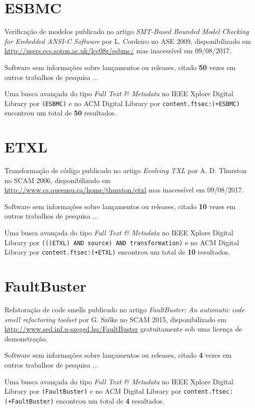 \section{ESBMC}

Verificação de modelos
publicado no artigo {\it SMT-Based Bounded Model Checking for Embedded ANSI-C Software}
por L. Cordeiro
no ASE 2009,
disponibilizado em \url{http://users.ecs.soton.ac.uk/lcc08r/esbmc/}
mas inacessível em 09/08/2017.

Software sem informações sobre lançamentos ou releases,
citado {\bf 50} vezes em outros trabalhos de pesquisa ...

Uma busca avançada do tipo {\it Full Text \& Metadata} no IEEE Xplore Digital Library por
\texttt{(ESBMC)}
e no ACM Digital Library por
\texttt{content.ftsec:(+ESBMC)}
encontrou um total de
{\bf 50}
resultados.

\section{ETXL}

Transformação de código
publicado no artigo {\it Evolving TXL}
por A. D. Thurston
no SCAM 2006,
disponibilizado em \url{http://www.cs.queensu.ca/home/thurston/etxl}
mas inacessível em 09/08/2017.

Software sem informações sobre lançamentos ou releases,
citado {\bf 10} vezes em outros trabalhos de pesquisa ...

Uma busca avançada do tipo {\it Full Text \& Metadata} no IEEE Xplore Digital Library por
\texttt{(((ETXL) AND source) AND transformation)}
e no ACM Digital Library por
\texttt{content.ftsec:(+ETXL)}
encontrou um total de
{\bf 10}
resultados.

\section{FaultBuster}

Refatoração de code smells
publicado no artigo {\it FaultBuster: An automatic code smell refactoring toolset}
por G. Szőke
no SCAM 2015,
disponibilizado em \url{http://www.sed.inf.u-szeged.hu/FaultBuster}
gratuitamente
sob uma licença de demonstração.

Software sem informações sobre lançamentos ou releases,
citado {\bf 4} vezes em outros trabalhos de pesquisa ...

Uma busca avançada do tipo {\it Full Text \& Metadata} no IEEE Xplore Digital Library por
\texttt{(FaultBuster)}
e no ACM Digital Library por
\texttt{content.ftsec:(+FaultBuster)}
encontrou um total de
{\bf 4}
resultados.

